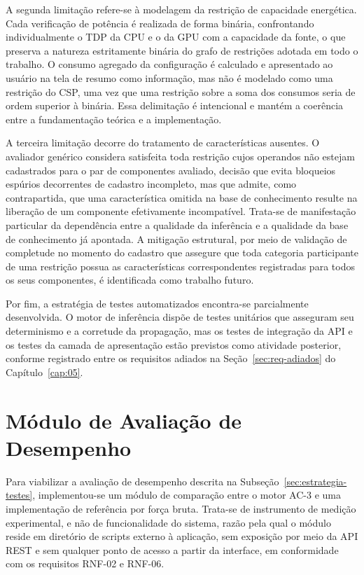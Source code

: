 A segunda limitação refere-se à modelagem da restrição de capacidade energética. Cada verificação de potência é realizada de forma binária, confrontando individualmente o TDP da CPU e o da GPU com a capacidade da fonte, o que preserva a natureza estritamente binária do grafo de restrições adotada em todo o trabalho. O consumo agregado da configuração é calculado e apresentado ao usuário na tela de resumo como informação, mas não é modelado como uma restrição do CSP, uma vez que uma restrição sobre a soma dos consumos seria de ordem superior à binária. Essa delimitação é intencional e mantém a coerência entre a fundamentação teórica e a implementação.

A terceira limitação decorre do tratamento de características ausentes. O avaliador genérico
considera satisfeita toda restrição cujos operandos não estejam cadastrados para o par de
componentes avaliado, decisão que evita bloqueios espúrios decorrentes de cadastro
incompleto, mas que admite, como contrapartida, que uma característica omitida na base de
conhecimento resulte na liberação de um componente efetivamente incompatível. Trata-se de
manifestação particular da dependência entre a qualidade da inferência e a qualidade da base
de conhecimento já apontada. A mitigação estrutural, por meio de validação de completude no
momento do cadastro que assegure que toda categoria participante de uma restrição possua as
características correspondentes registradas para todos os seus componentes, é identificada
como trabalho futuro.

Por fim, a estratégia de testes automatizados encontra-se parcialmente desenvolvida. O motor de inferência dispõe de testes unitários que asseguram seu determinismo e a corretude da propagação, mas os testes de integração da API e os testes da camada de apresentação estão previstos como atividade posterior, conforme registrado entre os requisitos adiados na Seção~\ref{sec:req-adiados} do Capítulo~\ref{cap:05}.

\section{Módulo de Avaliação de Desempenho}
\label{sec:impl-benchmark}

Para viabilizar a avaliação de desempenho descrita na
Subseção~\ref{sec:estrategia-testes}, implementou-se um módulo de comparação entre o
motor AC-3 e uma implementação de referência por força bruta. Trata-se de instrumento
de medição experimental, e não de funcionalidade do sistema, razão pela qual o módulo
reside em diretório de scripts externo à aplicação, sem exposição por meio da API REST
e sem qualquer ponto de acesso a partir da interface, em conformidade com os requisitos
RNF-02 e RNF-06.

